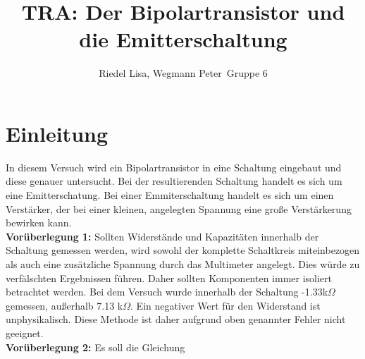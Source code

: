 \documentclass[a4paper,usenatbib]{aspdoc}
\title[]{TRA: Der Bipolartransistor und die Emitterschaltung}
\author[]{
    Riedel Lisa, Wegmann Peter
    \newauthor
    \,Gruppe 6
}
\begin{document}
    \label{firstpage}
    \pagerange{\pageref{firstpage}--\pageref{lastpage}}
    \maketitle
    
    
    
    \section{Einleitung} 
        In diesem Versuch wird ein Bipolartransistor in eine Schaltung eingebaut und diese genauer untersucht. Bei der resultierenden Schaltung handelt es sich um eine Emitterschatung. Bei einer Emmiterschaltung handelt es sich um einen Verstärker, der bei einer kleinen, angelegten Spannung eine große Verstärkerung bewirken kann. \\
        \textbf{Vorüberlegung 1:} Sollten Widerstände und Kapazitäten innerhalb der Schaltung gemessen werden, wird sowohl der komplette Schaltkreis miteinbezogen als auch eine zusätzliche Spannung durch das Multimeter angelegt. Dies würde zu verfälschten Ergebnissen führen. Daher sollten Komponenten immer isoliert betrachtet werden. Bei dem Versuch wurde innerhalb der Schaltung -1.33k$\Omega$ gemessen, außerhalb 7.13 k$\Omega$. Ein negativer Wert für den Widerstand ist unphysikalisch. Diese Methode ist daher aufgrund oben genannter Fehler nicht geeignet. \\
        \textbf{Vorüberlegung 2:} Es soll die Gleichung
        
\end{document}
